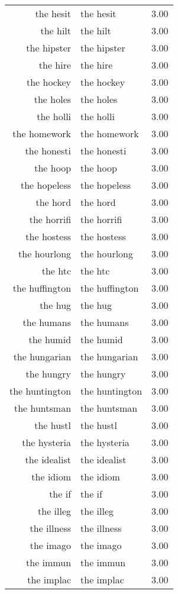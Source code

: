 \begin{table}[ht]
\begin{tabular}{rlr}
  the hesit & the hesit & 3.00 \\ 
  the hilt & the hilt & 3.00 \\ 
  the hipster & the hipster & 3.00 \\ 
  the hire & the hire & 3.00 \\ 
  the hockey & the hockey & 3.00 \\ 
  the holes & the holes & 3.00 \\ 
  the holli & the holli & 3.00 \\ 
  the homework & the homework & 3.00 \\ 
  the honesti & the honesti & 3.00 \\ 
  the hoop & the hoop & 3.00 \\ 
  the hopeless & the hopeless & 3.00 \\ 
  the hord & the hord & 3.00 \\ 
  the horrifi & the horrifi & 3.00 \\ 
  the hostess & the hostess & 3.00 \\ 
  the hourlong & the hourlong & 3.00 \\ 
  the htc & the htc & 3.00 \\ 
  the huffington & the huffington & 3.00 \\ 
  the hug & the hug & 3.00 \\ 
  the humans & the humans & 3.00 \\ 
  the humid & the humid & 3.00 \\ 
  the hungarian & the hungarian & 3.00 \\ 
  the hungry & the hungry & 3.00 \\ 
  the huntington & the huntington & 3.00 \\ 
  the huntsman & the huntsman & 3.00 \\ 
  the hustl & the hustl & 3.00 \\ 
  the hysteria & the hysteria & 3.00 \\ 
  the idealist & the idealist & 3.00 \\ 
  the idiom & the idiom & 3.00 \\ 
  the if & the if & 3.00 \\ 
  the illeg & the illeg & 3.00 \\ 
  the illness & the illness & 3.00 \\ 
  the imago & the imago & 3.00 \\ 
  the immun & the immun & 3.00 \\ 
  the implac & the implac & 3.00 \\ 

\end{tabular}
\end{table}
